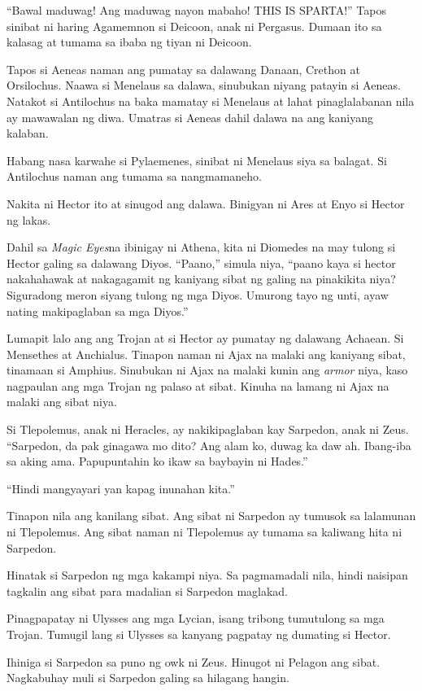 \documentclass[12pt,letterpaper]{report}
\begin{document}
``Bawal maduwag! Ang maduwag nayon mabaho! THIS IS SPARTA!'' Tapos sinibat ni haring Agamemnon si Deicoon, anak ni Pergasus. Dumaan ito sa kalasag at tumama sa ibaba ng tiyan ni Deicoon.

Tapos si Aeneas naman ang pumatay sa dalawang Danaan, Crethon at Orsilochus. Naawa si Menelaus sa dalawa, sinubukan niyang patayin si Aeneas. Natakot si Antilochus na baka mamatay si Menelaus at lahat pinaglalabanan nila ay mawawalan ng diwa. Umatras si Aeneas dahil dalawa na ang kaniyang kalaban.

Habang nasa karwahe si Pylaemenes, sinibat ni Menelaus siya sa balagat. Si Antilochus naman ang tumama sa nangmamaneho.

Nakita ni Hector ito at sinugod ang dalawa. Binigyan ni Ares at Enyo si Hector ng lakas.

Dahil sa \textit{Magic Eyes}\texttrademark na ibinigay ni Athena, kita ni Diomedes na may tulong si Hector galing sa dalawang Diyos. ``Paano,'' simula niya, ``paano kaya si hector nakahahawak at nakagagamit ng kaniyang sibat ng galing na pinakikita niya? Siguradong meron siyang tulong ng mga Diyos. Umurong tayo ng unti, ayaw nating makipaglaban sa mga Diyos.''

Lumapit lalo ang ang Trojan at si Hector ay pumatay ng dalawang Achaean. Si Mensethes at Anchialus. Tinapon naman ni Ajax na malaki ang kaniyang sibat, tinamaan si Amphius. Sinubukan ni Ajax na malaki kunin ang \textit{armor} niya, kaso nagpaulan ang mga Trojan ng palaso at sibat. Kinuha na lamang ni Ajax na malaki ang sibat niya.

Si Tlepolemus, anak ni Heracles, ay nakikipaglaban kay Sarpedon, anak ni Zeus. ``Sarpedon, da pak ginagawa mo dito? Ang alam ko, duwag ka daw ah. Ibang-iba sa aking ama. Papupuntahin ko ikaw sa baybayin ni Hades.''

``Hindi mangyayari yan kapag inunahan kita.''

Tinapon nila ang kanilang sibat. Ang sibat ni Sarpedon ay tumusok sa lalamunan ni Tlepolemus. Ang sibat naman ni Tlepolemus ay tumama sa kaliwang hita ni Sarpedon.

Hinatak si Sarpedon ng mga kakampi niya. Sa pagmamadali nila, hindi naisipan tagkalin ang sibat para madalian si Sarpedon maglakad.

Pinagpapatay ni Ulysses ang mga Lycian, isang tribong tumutulong sa mga Trojan. Tumugil lang si Ulysses sa kanyang pagpatay ng dumating si Hector.

Ihiniga si Sarpedon sa puno ng owk ni Zeus. Hinugot ni Pelagon ang sibat. Nagkabuhay muli si Sarpedon galing sa hilagang hangin.
\end{document}
